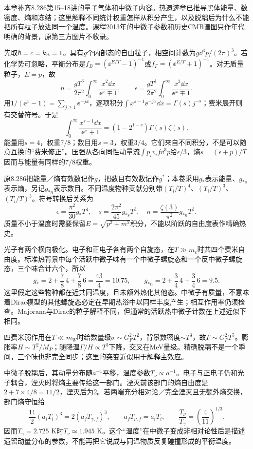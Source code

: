 本章补齐8.286第15--18讲的量子气体和中微子内容。热遗迹章已推导黑体能量、数密度、熵和冻结；这里解释不同统计权重怎样从积分产生，以及脱耦后为什么不能把所有粒子放进同一个温度。课程2013年的中微子参数和历史CMB谱图只作年代明确的背景，原第三方图片不收录。

先取$\hbar=c=k_{\mathrm B}=1$。具有$g$个内部态的自由粒子，相空间计数为$g\dd^3p/(2\pi)^3$。若化学势可忽略，平衡分布是$f_B=(\ee^{E/T}-1)^{-1}$或$f_F=(\ee^{E/T}+1)^{-1}$。对无质量粒子，$E=p$，故
\[
 n=\frac{gT^3}{2\pi^2}\int_0^\infty\frac{x^2\dd x}{\ee^x\mp1},\qquad
 \epsilon=\frac{gT^4}{2\pi^2}\int_0^\infty\frac{x^3\dd x}{\ee^x\mp1}.
\]
用$1/(\ee^x-1)=\sum_{j\geq1}\ee^{-jx}$，逐项积分$\int x^{s-1}\ee^{-jx}\dd x=\Gamma(s)j^{-s}$；费米展开则有交替符号。于是
\[
 \int_0^\infty\frac{x^{s-1}\dd x}{\ee^x+1}
 =(1-2^{1-s})\Gamma(s)\zeta(s).
\]
能量用$s=4$，权重$7/8$；数目用$s=3$，权重$3/4$。它们来自不同积分，不是可以随意互换的“费米修正”。压强从各向同性动量流$\int p_iv_i f\dd^3p$给$\epsilon/3$，熵$ s=(\epsilon+p)/T$因而与能量有同样的$7/8$权重。

原8.286把能量／熵有效数记作$g$，把数目有效数记作$g^*$；本卷采用$g_*$表示能量、$g_{*s}$表示熵，另记$g_{*n}$表示数目。不同温度物种贡献分别带$(T_i/T)^4$、$(T_i/T)^3$、$(T_i/T)^3$。符号转换后关系为
\[
 \epsilon=\frac{\pi^2}{30}g_*T^4,\quad
 s=\frac{2\pi^2}{45}g_{*s}T^3,\quad
 n=\frac{\zeta(3)}{\pi^2}g_{*n}T^3.
\]
质量不小于温度时需要保留$E=\sqrt{p^2+m^2}$积分，不能以阶跃的自由度表作精确热史。

光子有两个横向极化。电子和正电子各有两个自旋态，在$T\gg m_e$时共四个费米自由度。标准热背景中每个活跃中微子味有一个中微子螺旋态和一个反中微子螺旋态，三个味合计六个，所以
\[
 g_*=2+\frac78\,4+\frac78\,6=\frac{43}{4}=10.75,
 \qquad g_{*n}=2+\frac34\,4+\frac34\,6=9.5.
\]
这里假定这些物种都在近共同温度，且未额外热化其他态。中微子有质量，不意味着Dirac模型的其他螺旋态必定在早期热浴中以同样丰度产生；相互作用率仍须检查。Majorana与Dirac的粒子解释不同，但通常的活跃热中微子计数在上述近似下相同。

四费米弱作用在$T\ll m_W$时给数量级$\sigma\sim G_F^2T^2$，背景数密度$\sim T^3$，故$\Gamma\sim G_F^2T^5$。膨胀率$H\sim T^2/M_P$；随降温$\Gamma/H\propto T^3$下降，交叉在MeV量级。精确脱耦不是一个瞬间，三个味也非完全同步；这里的突变近似用于解释主效应。

中微子脱耦后，其动量分布随$a^{-1}$平移，温度参数$T_\nu\propto a^{-1}$。电子与正电子仍和光子耦合，湮灭时将熵主要传给这一部门。湮灭前该部门的熵自由度是$2+7\times4/8=11/2$，湮灭后为2。若两端充分相对论／完全湮灭且无额外熵交换，部门熵守恒给
\[
 \frac{11}{2}(a_iT_i)^3=2(a_fT_{\gamma,f})^3,
 \qquad a_fT_{\nu,f}=a_iT_i,
 \qquad \frac{T_\nu}{T_\gamma}=\left(\frac4{11}\right)^{1/3}.
\]
因而$T_\gamma=2.725$ K时$T_\nu\simeq1.945$ K。这个“温度”在中微子变成非相对论性后是描述遗留动量分布的参数，不能再把它说成与同温物质反复碰撞形成的平衡温度。

